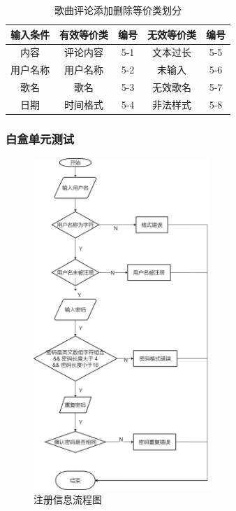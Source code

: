 \documentclass[UTF8,14pt]{article}
\numberwithin{figure}{subsubsection}
\numberwithin{table}{subsubsection}
\begin{document}
\begin{table}[H]
	\centering
	\begin{tabular}{|c|c|c|c|c|}
		\hline
		输入条件 & 有效等价类 & 编号 & 无效等价类 & 编号 \\ \hline
		内容     & 评论内容   & 5-1  & 文本过长   & 5-5  \\ \hline
		用户名称 & 用户名称   & 5-2  & 未输入     & 5-6  \\ \hline
		歌名     & 歌名       & 5-3  & 无效歌名   & 5-7  \\ \hline
		日期     & 时间格式   & 5-4  & 非法样式   & 5-8  \\ \hline
	\end{tabular}
	\caption{歌曲评论添加删除等价类划分}
\end{table}
\subsubsection{白盒单元测试}
\begin{minipage}[t]{0.5\linewidth}
	\centering
	\begin{figure}[H]
		\includegraphics[width=6.69cm,height=12.53cm]{白盒1.png}
		\caption{注册信息流程图}
	\end{figure}
\end{minipage}
\hfill
\end{document}
